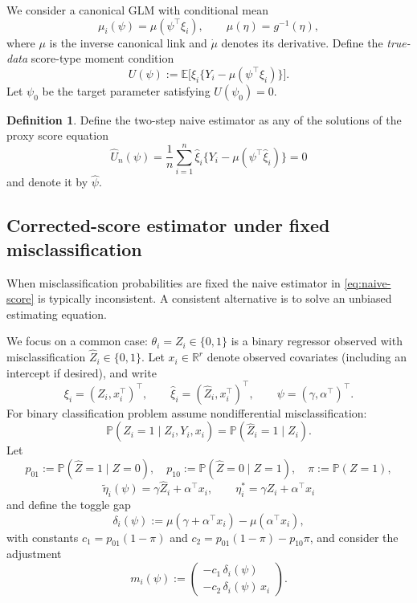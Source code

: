 \documentclass[11pt]{article}
\theoremstyle{definition}
\newtheorem{definition}{Definition}
\theoremstyle{remark}
\newcommand{\R}{\mathbb{R}}
\newcommand{\E}{\mathbb{E}}
\newcommand{\Pp}{\mathbb{P}}
\begin{document}
We consider a canonical GLM with conditional mean
\[
\mu_i(\psi)=\mu(\psi^\top\xi_i),\qquad \mu(\eta)=g^{-1}(\eta),
\]
where $\mu$ is the inverse canonical link and $\dot\mu$ denotes its derivative.
Define the \emph{true-data} score-type moment condition
\[
U(\psi):=\E\big[\xi_i\{Y_i-\mu(\psi^\top\xi_i)\}\big].
\]
Let $\psi_0$ be the target parameter satisfying $U(\psi_0)=0$.

\begin{definition}
Define the two-step naive estimator as any of the solutions of the proxy score equation
\begin{equation}
\hat U_n(\psi)=\frac{1}{n}\sum_{i=1}^n \hat\xi_i\{Y_i-\mu(\psi^\top\hat\xi_i)\}=0
\label{eq:naive-score}
\end{equation}
and denote it by $\hat\psi$.
\end{definition}

\subsection{Corrected-score estimator under fixed misclassification}
When misclassification probabilities are fixed the naive estimator in \eqref{eq:naive-score} is typically inconsistent. A consistent alternative is to solve an unbiased estimating equation.

We focus on a common case: $\theta_i=Z_i\in\{0,1\}$ is a binary regressor observed with misclassification $\hat Z_i\in\{0,1\}$.
Let $x_i\in\R^r$ denote observed covariates (including an intercept if desired), and write
\[
\xi_i=(Z_i,x_i^\top)^\top,\qquad \hat\xi_i=(\hat Z_i,x_i^\top)^\top,\qquad \psi=(\gamma,\alpha^\top)^\top.
\]
For binary classification problem assume nondifferential misclassification:
\[\Pp(\hat Z_i=1\mid Z_i,Y_i,x_i)=\Pp(\hat Z_i=1\mid Z_i).\]
Let
\[p_{01}:=\Pp(\hat Z=1\mid Z=0),\quad p_{10}:=\Pp(\hat Z=0\mid Z=1),\quad \pi:=\Pp(Z=1),\]
\[
\tilde\eta_i(\psi)=\gamma\hat Z_i+\alpha^\top x_i,\qquad \eta_i^*=\gamma Z_i+\alpha^\top x_i
\]
and define the toggle gap
\begin{equation}
\delta_i(\psi):=\mu(\gamma+\alpha^\top x_i)-\mu(\alpha^\top x_i),
\label{eq:delta}
\end{equation}
with constants $c_1=p_{01}(1-\pi)$ and $c_2=p_{01}(1-\pi)-p_{10}\pi$, and consider the adjustment
\begin{equation}
 m_i(\psi):=\begin{pmatrix}-c_1\,\delta_i(\psi)\\-c_2\,\delta_i(\psi)\,x_i\end{pmatrix}.
\label{eq:mi}
\end{equation}
\end{document}
